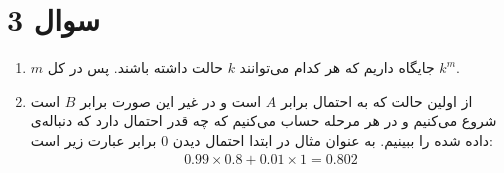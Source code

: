 \section*{سوال 3}
\begin{enumerate}
    \item $m$ جایگاه داریم که هر کدام می‌توانند $k$ حالت داشته باشند. پس در کل $k^m$.
    \item از اولین حالت که به احتمال 
    برابر
    $A$
    است و در غیر این صورت برابر
    $B$
    است شروع می‌کنیم و در هر مرحله حساب می‌کنیم که چه قدر احتمال دارد که دنباله‌ی داده شده را ببینیم.
    به عنوان مثال در ابتدا احتمال دیدن 0 برابر عبارت زیر است:
    \begin{gather*}
        0.99 \times 0.8 + 0.01 \times 1 = 0.802
    \end{gather*}
\end{enumerate}